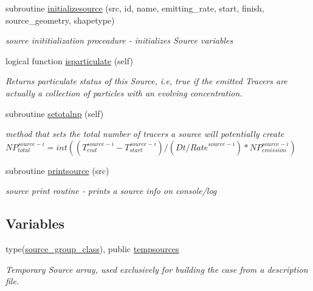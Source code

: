 \begin{DoxyCompactItemize}
subroutine \mbox{\hyperlink{namespacesources__mod_a6dcf7a3e3ccf75e01853df166231d484}{initializesource}} (src, id, name, emitting\+\_\+rate, start, finish, source\+\_\+geometry, shapetype)
\begin{DoxyCompactList}\small\item\em source inititialization proceadure -\/ initializes Source variables \end{DoxyCompactList}\item 
logical function \mbox{\hyperlink{namespacesources__mod_ac4e4f33da78d030e1b56a48789da6a05}{isparticulate}} (self)
\begin{DoxyCompactList}\small\item\em Returns particulate status of this Source, i.\+e, true if the emitted Tracers are actually a collection of particles with an evolving concentration. \end{DoxyCompactList}\item 
subroutine \mbox{\hyperlink{namespacesources__mod_a9a62c41b71d2d6ad85def74087542ef5}{setotalnp}} (self)
\begin{DoxyCompactList}\small\item\em method that sets the total number of tracers a source will potentially create ${NP}_{total}^{source-i}=int((T_{end}^{source-i}-T_{start}^{source-i})/(Dt/{Rate}^{source-i})*{NP}_{emission}^{source-i})$ \end{DoxyCompactList}\item 
subroutine \mbox{\hyperlink{namespacesources__mod_a641fe9ecc295e486a714c1aaa133d991}{printsource}} (src)
\begin{DoxyCompactList}\small\item\em source print routine -\/ prints a source info on console/log \end{DoxyCompactList}\end{DoxyCompactItemize}
\subsection*{Variables}
\begin{DoxyCompactItemize}
\item 
type(\mbox{\hyperlink{structsources__mod_1_1source__group__class}{source\+\_\+group\+\_\+class}}), public \mbox{\hyperlink{namespacesources__mod_ab04ea8c02cdf83a1a356c8710ae811d5}{tempsources}}
\begin{DoxyCompactList}\small\item\em Temporary Source array, used exclusively for building the case from a description file. \end{DoxyCompactList}\end{DoxyCompactItemize}


